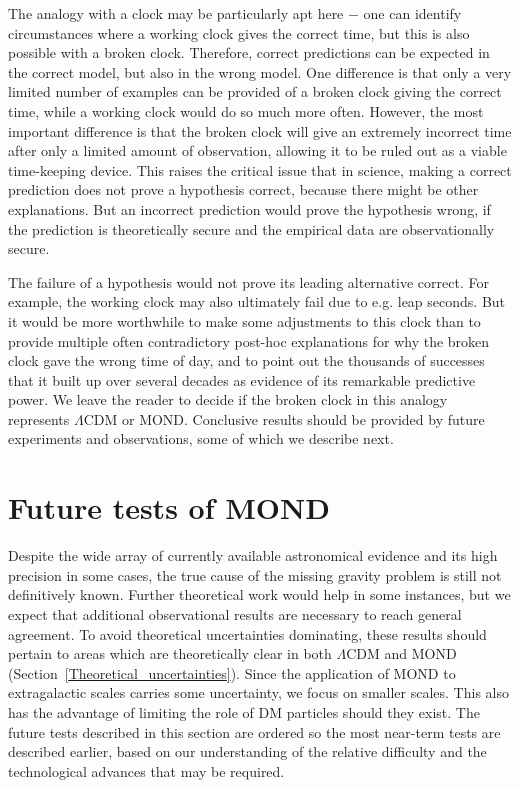 \documentclass[fleqn,usenatbib,useAMS,onecolumn]{mnras} %
\begin{document}
The analogy with a clock may be particularly apt here $-$ one can identify circumstances where a working clock gives the correct time, but this is also possible with a broken clock. Therefore, correct predictions can be expected in the correct model, but also in the wrong model. One difference is that only a very limited number of examples can be provided of a broken clock giving the correct time, while a working clock would do so much more often. However, the most important difference is that the broken clock will give an extremely incorrect time after only a limited amount of observation, allowing it to be ruled out as a viable time-keeping device. This raises the critical issue that in science, making a correct prediction does not prove a hypothesis correct, because there might be other explanations. But an incorrect prediction would prove the hypothesis wrong, if the prediction is theoretically secure and the empirical data are observationally secure.

The failure of a hypothesis would not prove its leading alternative correct. For example, the working clock may also ultimately fail due to e.g. leap seconds. But it would be more worthwhile to make some adjustments to this clock than to provide multiple often contradictory post-hoc explanations for why the broken clock gave the wrong time of day, and to point out the thousands of successes that it built up over several decades as evidence of its remarkable predictive power. We leave the reader to decide if the broken clock in this analogy represents $\Lambda$CDM or MOND. Conclusive results should be provided by future experiments and observations, some of which we describe next.





\section{Future tests of MOND}
\label{Future_tests}

Despite the wide array of currently available astronomical evidence and its high precision in some cases, the true cause of the missing gravity problem is still not definitively known. Further theoretical work would help in some instances, but we expect that additional observational results are necessary to reach general agreement. To avoid theoretical uncertainties dominating, these results should pertain to areas which are theoretically clear in both $\Lambda$CDM and MOND (Section~\ref{Theoretical_uncertainties}). Since the application of MOND to extragalactic scales carries some uncertainty, we focus on smaller scales. This also has the advantage of limiting the role of DM particles should they exist. The future tests described in this section are ordered so the most near-term tests are described earlier, based on our understanding of the relative difficulty and the technological advances that may be required.
\end{document}
